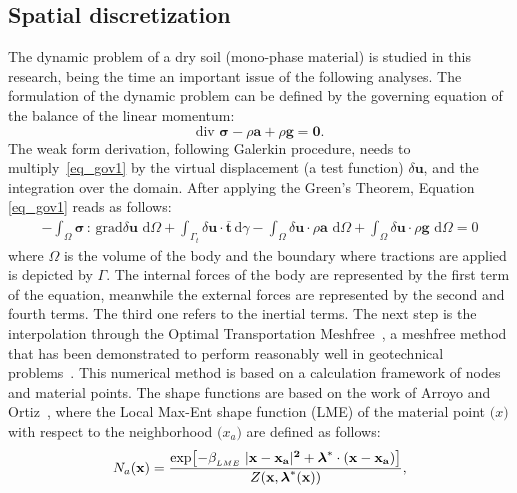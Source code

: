 \documentclass[applsci,journal,article,submit,moreauthors,pdftex]{Definitions/mdpi}
\newcommand{\differential}[1]
{\mathrm{d}#1}
\begin{document}
\subsection{Spatial discretization}
The dynamic problem of a dry soil (mono-phase material) is studied in this research, being the time an important issue of the following analyses. The formulation of the dynamic problem can be defined by the governing equation of the balance of the linear momentum:
\begin{equation}\label{eq_gov1}
 \mbox{div } \boldsymbol{\sigma}-\rho\boldsymbol{a}+\rho\boldsymbol{g}=\boldsymbol{0}.
\end{equation}
The weak form derivation, following Galerkin procedure, needs to multiply~\eqref{eq_gov1} by the virtual displacement (a test function) $\delta \boldsymbol{u}$, and the integration over the domain. After applying the Green's Theorem, Equation \eqref{eq_gov1} reads as follows:
\begin{eqnarray} \label{eq_gov1_a}
-\int_\Omega \boldsymbol{ \sigma} \, : \, \mbox{grad} \delta\boldsymbol{u} \,\, \differential{\Omega} + \int_{\Gamma_{t}} \delta\boldsymbol{u} \cdot\boldsymbol{\overline{t}} \, \differential \gamma - \int_\Omega \delta\boldsymbol{u} \cdot  \rho\boldsymbol{a}  \,\, \differential{\Omega} + \int_\Omega \delta\boldsymbol{u} \cdot 
\rho\boldsymbol{g}  \,\, \differential{\Omega}= 0 
\end{eqnarray}
where $\Omega$ is the volume of the body and the boundary where tractions are applied is depicted by $\Gamma$. The internal forces of the body are represented by the first term of the equation, meanwhile the external forces are represented by the second and fourth terms. The third one refers to the inertial terms. The next step is the interpolation through the Optimal Transportation Meshfree~\cite{li2010,li2014,Huang2019}, a meshfree method that has been demonstrated to perform reasonably well in geotechnical problems~\cite{Navas2020,Navas2021}. This numerical method is based on a calculation framework of nodes and material points. The shape functions are based on the work of Arroyo and Ortiz~\cite{arroyo2006}, where the Local Max-Ent shape function (LME) of the material point $\boldsymbol(x)$ with respect to the neighborhood $\boldsymbol(x_a)$ are defined as follows:
\begin{equation} \label{eq_N1}
N_a(\textbf{x})=\frac{\exp\left[ -\beta_{_{LME}} \; |\bf{x-x_a}|^2 +  \boldsymbol{\lambda}^*  \cdot  (x-x_a)  \right] } {Z(\textbf{x},\boldsymbol{\lambda}^*(\textbf{x}))},
\end{equation}
\end{document}
